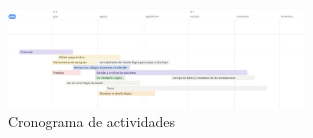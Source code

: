 \begin{figure}[h]
   \centering
    \includegraphics[angle=90, scale=0.6, width=0.7\textwidth, height=1.12\textwidth ]{figuras/Crono.JPG}
    \caption{Cronograma de actividades}
    \label{fig:mesh1}
\end{figure}